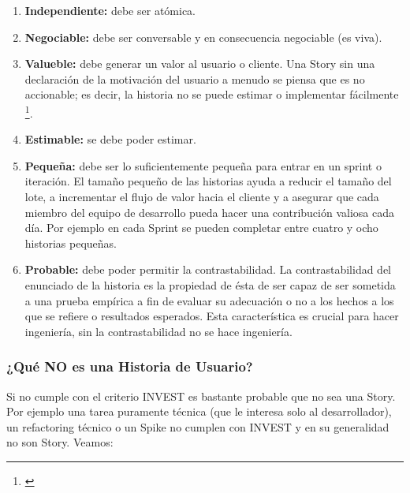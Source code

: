 \begin{enumerate}

\item \textbf{Independiente:} debe ser atómica.

\item \textbf{Negociable:} debe ser conversable y en consecuencia negociable (es viva).

\item \textbf{Valueble:} debe generar un valor al usuario o cliente. Una Story sin una declaración de la motivación del usuario a menudo se piensa que es no accionable; es decir, la historia no se puede estimar o implementar fácilmente \footnote{\cite{Scott-Bellware-2008}}.

\item \textbf{Estimable:} se debe poder estimar.

\item \textbf{Pequeña:} debe ser lo suficientemente pequeña para entrar en un sprint o iteración. El tamaño pequeño de las historias ayuda a reducir el tamaño del lote, a incrementar el flujo de valor hacia el cliente y a asegurar que cada miembro del equipo de desarrollo pueda hacer una contribución valiosa cada día. Por ejemplo en cada Sprint se pueden completar entre cuatro y ocho historias pequeñas.

\item \textbf{Probable:} debe poder permitir la contrastabilidad. La contrastabilidad del enunciado de la historia es la propiedad de ésta de ser capaz de ser sometida a una prueba empírica a fin de evaluar su adecuación o no a los hechos a los que se refiere o resultados esperados. Esta característica es crucial para hacer ingeniería, sin la contrastabilidad no se hace ingeniería.

\end{enumerate}

\subsubsection{¿Qué NO es una Historia de Usuario?}

Si no cumple con el criterio INVEST es bastante probable que no sea una Story. Por ejemplo una tarea puramente técnica (que le interesa solo al desarrollador), un refactoring técnico o un Spike no cumplen con INVEST y en su generalidad no son Story. Veamos:

